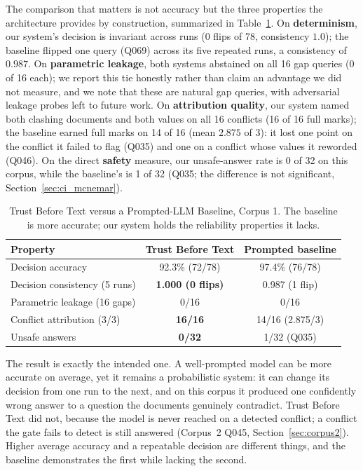 \documentclass[conference]{IEEEtran}
\begin{document}
The comparison that matters is not accuracy but the three properties the
architecture provides by construction, summarized in
Table~\ref{tab:headtohead}. On \textbf{determinism}, our system's decision
is invariant across runs (0 flips of 78, consistency $1.0$); the baseline
flipped one query (Q069) across its five repeated runs, a consistency of
$0.987$. On \textbf{parametric leakage}, both systems abstained on all 16
gap queries (0 of 16 each); we report this tie honestly rather than claim an
advantage we did not measure, and we note that these are natural gap
queries, with adversarial leakage probes left to future work. On
\textbf{attribution quality}, our system named both clashing documents and
both values on all 16 conflicts (16 of 16 full marks); the baseline earned
full marks on 14 of 16 (mean $2.875$ of 3): it lost one point on the
conflict it failed to flag (Q035) and one on a conflict whose values it
reworded (Q046). On the direct \textbf{safety} measure, our
unsafe-answer rate is 0 of 32 on this corpus, while the baseline's is 1 of
32 (Q035; the difference is not significant, Section~\ref{sec:ci_mcnemar}).

\begin{table}[htbp]
\caption{Trust Before Text versus a Prompted-LLM Baseline, Corpus 1. The
baseline is more accurate; our system holds the reliability properties it
lacks.}
\label{tab:headtohead}
\centering
\small
\begin{tabularx}{\columnwidth}{@{}X c c@{}}
\toprule
Property & Trust Before Text & Prompted baseline \\
\midrule
Decision accuracy              & 92.3\% (72/78)      & 97.4\% (76/78) \\
Decision consistency (5 runs)  & \textbf{1.000 (0 flips)} & 0.987 (1 flip) \\
Parametric leakage (16 gaps)   & 0/16                & 0/16 \\
Conflict attribution (3/3)     & \textbf{16/16}      & 14/16 (2.875/3) \\
Unsafe answers                 & \textbf{0/32}       & 1/32 (Q035) \\
\bottomrule
\end{tabularx}
\end{table}

The result is exactly the intended one. A well-prompted model can be more
accurate on average, yet it remains a probabilistic system: it can change
its decision from one run to the next, and on this corpus it produced one
confidently wrong answer to a question the documents genuinely contradict.
Trust Before Text did not, because the model is never reached on a detected
conflict; a conflict the gate fails to detect is still answered (Corpus~2
Q045, Section~\ref{sec:corpus2}). Higher average accuracy and a repeatable
decision are different things, and the baseline demonstrates the first while
lacking the second.
\end{document}
